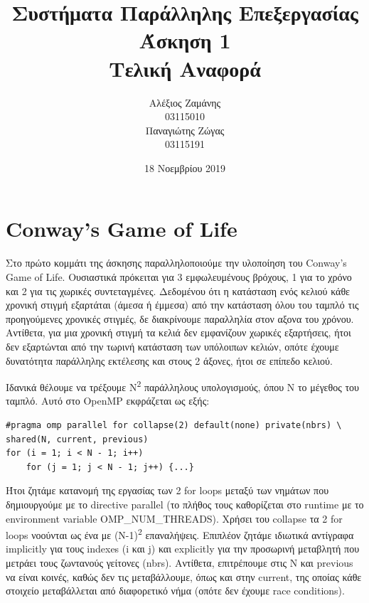 \documentclass[12pt,titlepage]{article}
\begin{document}
\title{Συστήματα Παράλληλης Επεξεργασίας\\
    Άσκηση 1\\
    Τελική Αναφορά}
\author{Αλέξιος Ζαμάνης\\
    03115010\\
    Παναγιώτης Ζώγας\\
    03115191}
\date{18 Νοεμβρίου 2019}

\maketitle

\section{Conway's Game of Life}

Στο πρώτο κομμάτι της άσκησης παραλληλοποιούμε την υλοποίηση του Conway's Game
of Life. Ουσιαστικά πρόκειται για 3 εμφωλευμένους βρόχους, 1 για το χρόνο και 2
για τις χωρικές συντεταγμένες. Δεδομένου ότι η κατάσταση ενός κελιού κάθε χρονική
στιγμή εξαρτάται (άμεσα ή έμμεσα) από την κατάσταση όλου του ταμπλό τις
προηγούμενες χρονικές στιγμές, δε διακρίνουμε παραλληλία στον αξονα του χρόνου.
Αντίθετα, για μια χρονική στιγμή τα κελιά δεν εμφανίζουν χωρικές εξαρτήσεις,
ήτοι δεν εξαρτώνται από την τωρινή κατάσταση των υπόλοιπων κελιών, οπότε έχουμε
δυνατότητα παράλληλης εκτέλεσης και στους 2 άξονες, ήτοι σε επίπεδο κελιού.

Ιδανικά θέλουμε να τρέξουμε N\textsuperscript2 παράλληλους υπολογισμούς, όπου N
το μέγεθος του ταμπλό. Αυτό στο OpenMP εκφράζεται ως εξής:

\begin{verbatim}
#pragma omp parallel for collapse(2) default(none) private(nbrs) \
shared(N, current, previous)
for (i = 1; i < N - 1; i++) 
    for (j = 1; j < N - 1; j++) {...}
\end{verbatim}

Ήτοι ζητάμε κατανομή της εργασίας των 2 for loops μεταξύ των νημάτων που
δημιουργούμε με το directive parallel (το πλήθος τους καθορίζεται στο runtime
με το environment variable OMP\_NUM\_THREADS). Χρήσει του collapse τα 2 for
loops νοούνται ως ένα με (N-1)\textsuperscript{2} επαναλήψεις. Επιπλέον ζητάμε
ιδιωτικά αντίγραφα implicitly για τους indexes (i και j) και explicitly για την
προσωρινή μεταβλητή που μετράει τους ζωντανούς γείτονες (nbrs). Αντίθετα,
επιτρέπουμε στις N και previous να είναι κοινές, καθώς δεν τις μεταβάλλουμε,
όπως και στην current, της οποίας κάθε στοιχείο μεταβάλλεται από διαφορετικό
νήμα (οπότε δεν έχουμε race conditions).
\end{document}

